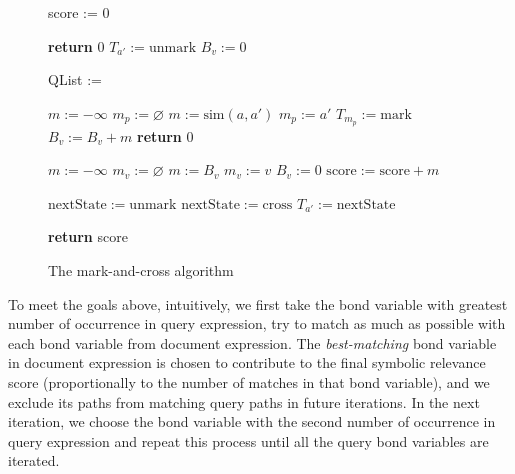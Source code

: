 \documentclass{acm_proc_article-sp}
\begin{document}
\begin{figure}
\begin{algorithmic}[1]

\State score := 0

\State \textbf{return} 0 
\EndIf
{}
\State $T_{a'} := \mathrm{unmark}$ 
\EndFor
{}
\State $B_v := 0$ 
\EndFor

\State QList := 


\State $m := -\infty$
\State $m_p := \varnothing$
\State $m := \mathrm{sim}(a, a')$ 
\State $m_p := a'$ 
\EndIf
\EndFor
{}
\State $T_{m_p} := \mathrm{mark}$ 
\State $B_v := B_v + m$
\Else
{}
\State \textbf{return} 0 
\EndIf
\EndFor

\label{line_bond_finish}

\State $m := -\infty$
\State $m_v := \varnothing $
\State $m := B_v$ 
\State $m_v := v$ 
\EndIf
\State $B_v := 0$ 
\EndFor
\State $\mathrm{score} := \mathrm{score} + m$ 

\State $\mathrm{nextState} := \mathrm{unmark}$ 
\Else
\State $\mathrm{nextState} := \mathrm{cross}$ 
\EndIf
{}
\State $T_{a'} := \mathrm{nextState}$ 
\EndIf
\EndFor
\EndFor

\EndIf

\EndFor

\State \textbf{return} score
\EndProcedure

\end{algorithmic}
\caption{The mark-and-cross algorithm}\label{markcrossalgo}
\end{figure}

To meet the goals above, intuitively, we first take the bond variable with greatest number of occurrence in query expression, try to match as much as possible with each bond variable from document expression. 
The \textit{best-matching} bond variable in document expression is chosen to contribute to the final symbolic relevance score (proportionally to the number of matches in that bond variable), 
and we exclude its paths from matching query paths in future iterations.
In the next iteration, we choose the bond variable with the second number of occurrence in query expression and repeat this process until all the query bond variables are iterated.
\end{document}

